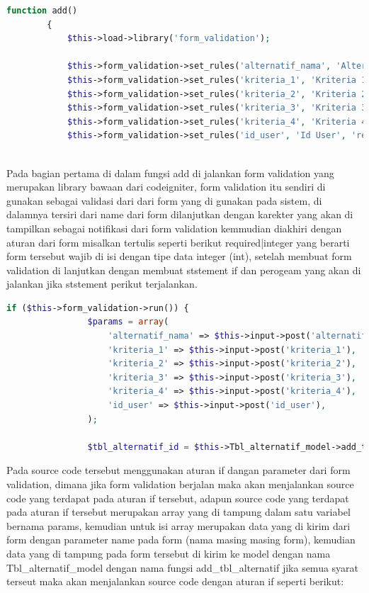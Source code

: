 \begin{lstlisting}[language=PHP]
	function add()  
	    {  
	        $this->load->library('form_validation');  
	  
	        $this->form_validation->set_rules('alternatif_nama', 'Alternatif Nama', 'required|max_length[30]');  
	        $this->form_validation->set_rules('kriteria_1', 'Kriteria 1', 'required|integer');  
	        $this->form_validation->set_rules('kriteria_2', 'Kriteria 2', 'required|integer');  
	        $this->form_validation->set_rules('kriteria_3', 'Kriteria 3', 'required|integer');  
	        $this->form_validation->set_rules('kriteria_4', 'Kriteria 4', 'required|integer');  
	        $this->form_validation->set_rules('id_user', 'Id User', 'required|integer');  
	  
\end{lstlisting}


Pada bagian pertama di dalam fungsi add di jalankan form validation yang merupakan library bawaan dari codeigniter, form validation itu sendiri di gunakan sebagai validasi dari dari form yang di gunakan pada sistem, di dalamnya tersiri dari name dari form dilanjutkan dengan karekter yang akan di tampilkan sebagai notifikasi dari form validation kemmudian diakhiri dengan aturan dari form misalkan tertulis seperti berikut required|integer yang berarti form tersebut wajib di isi dengan tipe data integer (int), setelah membuat form validation di lanjutkan dengan membuat ststement if dan perogeam yang akan di jalankan jika ststement perikut terjalankan.\par

\begin{lstlisting}[language=PHP]
	        if ($this->form_validation->run()) {  
	            $params = array(  
	                'alternatif_nama' => $this->input->post('alternatif_nama'),  
	                'kriteria_1' => $this->input->post('kriteria_1'),  
	                'kriteria_2' => $this->input->post('kriteria_2'),  
	                'kriteria_3' => $this->input->post('kriteria_3'),  
	                'kriteria_4' => $this->input->post('kriteria_4'),  
	                'id_user' => $this->input->post('id_user'),  
	            );  
	  
	            $tbl_alternatif_id = $this->Tbl_alternatif_model->add_tbl_alternatif($params);  

\end{lstlisting}

Pada source code tersebut menggunakan aturan if dangan parameter dari form validation, dimana jika form validation berjalan maka akan menjalankan source code yang terdapat pada aturan if tersebut, adapun source code yang terdapat pada aturan if tersebut merupakan array yang di tampung dalam satu variabel bernama params, kemudian untuk isi array merupakan data yang di kirim dari form dengan parameter name pada form (nama masing masing form), kemudian data yang di tampung pada form tersebut di kirim ke model dengan nama Tbl\_alternatif\_model dengan nama fungsi add\_tbl\_alternatif jika semua syarat terseut maka akan menjalankan source code dengan aturan if seperti berikut:\par


